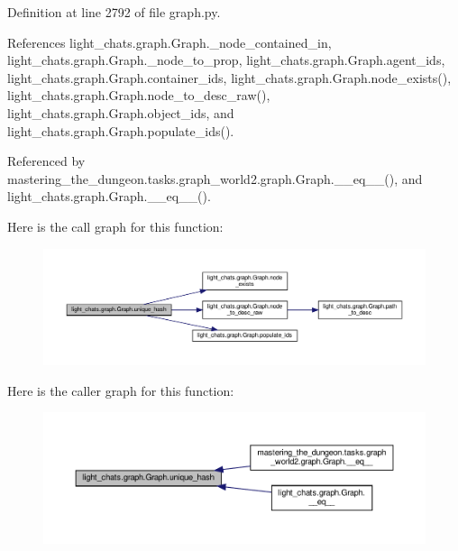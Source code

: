 Definition at line 2792 of file graph.\+py.



References light\+\_\+chats.\+graph.\+Graph.\+\_\+node\+\_\+contained\+\_\+in, light\+\_\+chats.\+graph.\+Graph.\+\_\+node\+\_\+to\+\_\+prop, light\+\_\+chats.\+graph.\+Graph.\+agent\+\_\+ids, light\+\_\+chats.\+graph.\+Graph.\+container\+\_\+ids, light\+\_\+chats.\+graph.\+Graph.\+node\+\_\+exists(), light\+\_\+chats.\+graph.\+Graph.\+node\+\_\+to\+\_\+desc\+\_\+raw(), light\+\_\+chats.\+graph.\+Graph.\+object\+\_\+ids, and light\+\_\+chats.\+graph.\+Graph.\+populate\+\_\+ids().



Referenced by mastering\+\_\+the\+\_\+dungeon.\+tasks.\+graph\+\_\+world2.\+graph.\+Graph.\+\_\+\+\_\+eq\+\_\+\+\_\+(), and light\+\_\+chats.\+graph.\+Graph.\+\_\+\+\_\+eq\+\_\+\+\_\+().

Here is the call graph for this function\+:
\nopagebreak
\begin{figure}[H]
\begin{center}
\leavevmode
\includegraphics[width=350pt]{classlight__chats_1_1graph_1_1Graph_a5f54739484e05010202517a4714af30f_cgraph}
\end{center}
\end{figure}
Here is the caller graph for this function\+:
\nopagebreak
\begin{figure}[H]
\begin{center}
\leavevmode
\includegraphics[width=350pt]{classlight__chats_1_1graph_1_1Graph_a5f54739484e05010202517a4714af30f_icgraph}
\end{center}
\end{figure}
\mbox{\label{classlight__chats_1_1graph_1_1Graph_a7a4820f5a9eff4261a81df8537937ac1}} 

